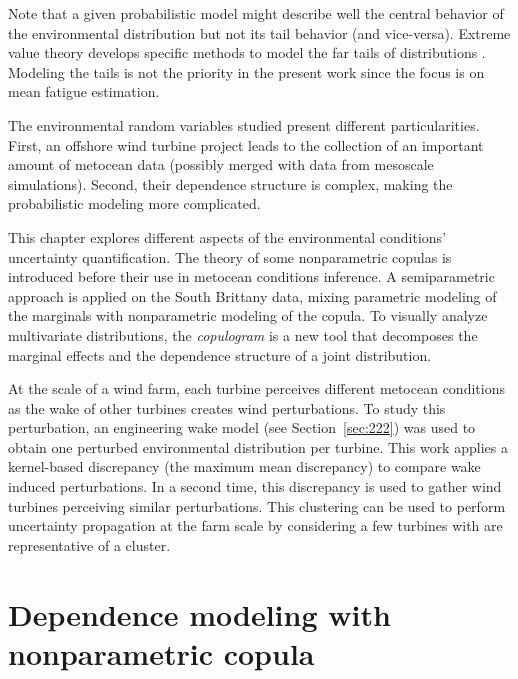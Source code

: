 Note that a given probabilistic model might describe well the central behavior of the environmental distribution but not its tail behavior (and vice-versa).   
Extreme value theory develops specific methods to model the far tails of distributions \citep{beirlant_2006_extreme_values}. 
Modeling the tails is not the priority in the present work since the focus is on mean fatigue estimation.   

The environmental random variables studied present different particularities. 
First, an offshore wind turbine project leads to the collection of an important amount of metocean data (possibly merged with data from mesoscale simulations). 
Second, their dependence structure is complex, making the probabilistic modeling more complicated. 

This chapter explores different aspects of the environmental conditions' uncertainty quantification. 
The theory of some nonparametric copulas is introduced before their use in metocean conditions inference. 
A semiparametric approach is applied on the South Brittany data, mixing parametric modeling of the marginals with nonparametric modeling of the copula. 
To visually analyze multivariate distributions, the \textit{copulogram} is a new tool that decomposes the marginal effects and the dependence structure of a joint distribution. 

At the scale of a wind farm, each turbine perceives different metocean conditions as the wake of other turbines creates wind perturbations. 
To study this perturbation, an engineering wake model (see Section~\ref{sec:222}) was used to obtain one perturbed environmental distribution per turbine. 
This work applies a kernel-based discrepancy (the maximum mean discrepancy) to compare wake induced perturbations. 
In a second time, this discrepancy is used to gather wind turbines perceiving similar perturbations. 
This clustering can be used to perform uncertainty propagation at the farm scale by considering a few turbines with are representative of a cluster. 


\section{Dependence modeling with nonparametric copula}\label{sec:nonparametric_copula}


